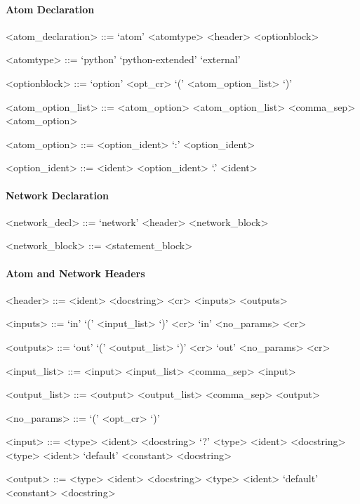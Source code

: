 \paragraph{Atom Declaration}

\begin{grammar}
  <atom_declaration> ::= `atom' <atomtype> <header> <optionblock>

  <atomtype> ::= `python'
  \alt `python-extended'
  \alt `external'

  <optionblock> ::= `option' <opt_cr> `(' <atom_option_list> `)'

  <atom_option_list> ::= <atom_option>
  \alt <atom_option_list> <comma_sep> <atom_option>

  <atom_option> ::= <option_ident> `:' <option_ident>

  <option_ident> ::= <ident>
  \alt <option_ident> `.' <ident>
\end{grammar}


\paragraph{Network Declaration}

\begin{grammar}
  <network_decl> ::= `network' <header> <network_block>

  <network_block> ::= <statement_block>
\end{grammar}


\paragraph{Atom and Network Headers}

\begin{grammar}
  <header> ::= <ident> <docstring> <cr> <inputs> <outputs>

  <inputs> ::= `in' `(' <input_list> `)' <cr>
  \alt `in' <no_params> <cr>

  <outputs> ::= `out' `(' <output_list> `)' <cr>
  \alt `out' <no_params> <cr>

  <input_list> ::= <input>
  \alt <input_list> <comma_sep> <input>

  <output_list> ::= <output>
  \alt <output_list> <comma_sep> <output>

  <no_params> ::= `(' <opt_cr> `)'

  <input> ::= <type> <ident> <docstring>
  \alt `?' <type> <ident> <docstring>
  \alt <type> <ident> `default' <constant> <docstring>

  <output> ::= <type> <ident> <docstring>
  \alt <type> <ident> `default' <constant> <docstring>
\end{grammar}


